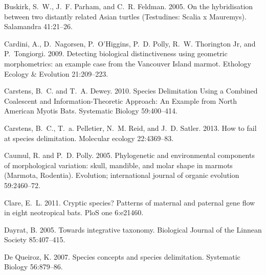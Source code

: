 \documentclass[12pt,letterpaper]{article}
\begin{document}
\begin{thebibliography}{77}
        Buskirk, S.~W., J.~F. Parham, and C.~R. Feldman. 2005. {On the hybridisation
        between two distantly related Asian turtles (Testudines: Scalia x Mauremys)}.
        Salamandra 41:21--26.

        Cardini, A., D.~Nagorsen, P.~O'Higgins, P.~D. Polly, R.~W. {Thorington Jr}, and
        P.~Tongiorgi. 2009. {Detecting biological distinctiveness using geometric
        morphometrics: an example case from the Vancouver Island marmot}. Ethology
        Ecology \& Evolution 21:209--223.

        Carstens, B.~C. and T.~A. Dewey. 2010. {Species Delimitation Using a Combined
          Coalescent and Information-Theoretic Approach: An Example from North American
        Myotis Bats}. Systematic Biology 59:400--414.

        Carstens, B.~C., T.~a. Pelletier, N.~M. Reid, and J.~D. Satler. 2013. {How to
        fail at species delimitation.} Molecular ecology 22:4369--83.

        Caumul, R. and P.~D. Polly. 2005. {Phylogenetic and environmental components of
          morphological variation: skull, mandible, and molar shape in marmots
        (Marmota, Rodentia).} Evolution; international journal of organic evolution
        59:2460--72.

        Clare, E.~L. 2011. {Cryptic species? Patterns of maternal and paternal gene
        flow in eight neotropical bats.} PloS one 6:e21460.

        Dayrat, B. 2005. {Towards integrative taxonomy}. Biological Journal of the
        Linnean Society 85:407--415.

        {De Queiroz}, K. 2007. {Species concepts and species delimitation.} Systematic
        Biology 56:879--86.


\end{thebibliography}
\end{document}

